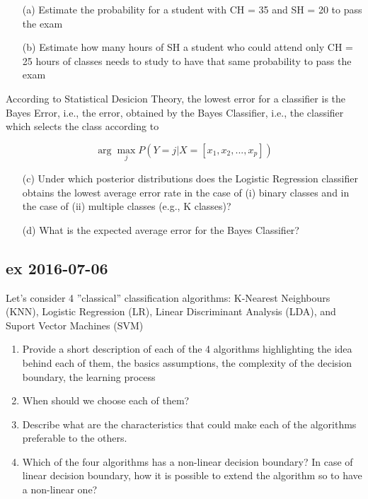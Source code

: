 \documentclass[a4paper,12pt,titlepage]{article} %
\begin{document}
\begin{itemize}
\item[(a)] Estimate the probability for a student with CH = 35 and SH = 20 to pass the exam
\item[(b)] Estimate how many hours of SH a student who could attend only CH = 25 hours of classes needs to study to have that same probability to pass the exam
\end{itemize}

According to Statistical Desicion Theory, the lowest error for a classifier is the Bayes Error, i.e., the error, obtained by the Bayes Classifier, i.e., the classifier which selects the class according to 

$$ \arg \max_{j} P (Y = j | X = [x_{1}, x_{2}, ..., x_{p}]) $$

\begin{itemize}
\item[(c)] Under which posterior distributions does the Logistic Regression classifier obtains the lowest average error rate in the case of (i) binary classes and in the case of (ii) multiple classes (e.g., K classes)?
\item[(d)] What is the expected average error for the Bayes Classifier? 
\end{itemize}

\subsection{ex 2016-07-06}
Let's consider 4 ''classical'' classification algorithms: K-Nearest Neighbours (KNN), Logistic Regression (LR), Linear Discriminant Analysis (LDA), and Suport Vector Machines (SVM)
\begin{enumerate}
\item Provide a short description of each of the 4 algorithms highlighting the idea behind each of them, the basics assumptions, the complexity of the decision boundary, the learning process 
\item When should we choose each of them?
\item Describe what are the characteristics that could make each of the algorithms preferable to the others.
\item Which of the four algorithms has a non-linear decision boundary? In case of linear decision boundary, how it is possible to extend the algorithm so to have a non-linear one?
\end{enumerate}

\newpage
\end{document}
